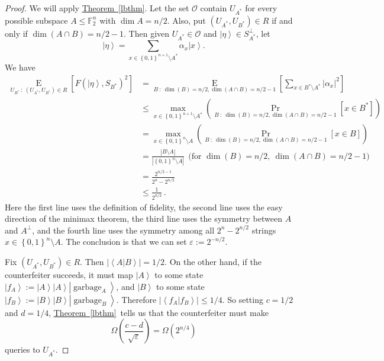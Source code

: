 \documentclass[10pt]{article}
\theoremstyle{definition}
\numberwithin{equation}{section}
\newcommand{\expref}[2]{\texorpdfstring{\hyperref[#2]{#1~\ref{#2}}}{#1~\ref{#2}}}
\begin{document}
\begin{proof}
We will apply \expref{Theorem}{lbthm}. Let the set $\mathcal{O}$ contain
$U_{A^{\ast}}$ for every possible subspace $A\leq\mathbb{F}_{2}^{n}$ with
$\dim A=n/2$. Also, put $\left(  U_{A^{\ast}},U_{B^{\ast}}\right)  \in
R$ if and only if $\dim\left(  A\cap B\right)  =n/2-1$. Then given
$U_{A^{\ast}}\in\mathcal{O}$ and $\left\vert \eta\right\rangle \in
S_{A^{\ast}}^{\bot}$, let%
\[
\left\vert \eta\right\rangle =\sum_{x\in\left\{  0,1\right\}  ^{n+1}\setminus
A^{\ast}}\alpha_{x}\left\vert x\right\rangle .
\]
We have%
\begin{align*}
\operatorname*{E}_{U_{B^{\ast}}~:~\left(  U_{A^{\ast}},U_{B^{\ast}}\right)
\in R}\left[  F\left(  \left\vert \eta\right\rangle ,S_{B^{\ast}}\right)
^{2}\right]   &  =\operatorname*{E}_{B~:~\dim\left(  B\right)  =n/2,\dim
\left(  A\cap B\right)  =n/2-1}\left[  \sum_{x\in B^{\ast}\setminus A^{\ast}%
}\left\vert \alpha_{x}\right\vert ^{2}\right] \\
&  \leq\max_{x\in\left\{  0,1\right\}  ^{n+1}\setminus A^{\ast}}\left(
\Pr_{B~:~\dim\left(  B\right)  =n/2,\dim\left(  A\cap B\right)  =n/2-1}\left[
x\in B^{\ast}\right]  \right) \\
&  =\max_{x\in\left\{  0,1\right\}  ^{n}\setminus A}\left(  \Pr_{B~:~\dim
\left(  B\right)  =n/2,\dim\left(  A\cap B\right)  =n/2-1}\left[  x\in
B\right]  \right) \\
&  =\frac{\left\vert B\setminus A\right\vert }{\left\vert \left\{
0,1\right\}  ^{n}\setminus A\right\vert }~~\text{(for }\dim\left(  B\right)
=n/2,~\dim\left(  A\cap B\right)  =n/2-1\text{)}\\
&  =\frac{2^{n/2-1}}{2^{n}-2^{n/2}}\\
&  \leq\frac{1}{2^{n/2}}\,.
\end{align*}
Here the first line uses the definition of fidelity, the second line uses the
easy direction of the minimax theorem, the third line uses the symmetry
between $A$ and $A^{\bot}$, and the fourth line uses the symmetry among all
$2^{n}-2^{n/2}$ strings\ $x\in\left\{  0,1\right\}  ^{n}\setminus A$. The
conclusion is that we can set $\varepsilon:=2^{-n/2}$.

Fix $\left(  U_{A^{\ast}},U_{B^{\ast}}\right)  \in R$. Then $\left\vert
\left\langle A|B\right\rangle \right\vert =1/2$. On the other hand, if the
counterfeiter succeeds, it must map $\left\vert A\right\rangle $ to some
state $\left\vert f_{A}\right\rangle :=\left\vert A\right\rangle \left\vert
A\right\rangle \left\vert \operatorname{garbage}_{A}\right\rangle $, and
$\left\vert B\right\rangle $ to some state $\left\vert f_{B}\right\rangle
:=\left\vert B\right\rangle \left\vert B\right\rangle \left\vert
\operatorname{garbage}_{B}\right\rangle $. Therefore $\left\vert
\left\langle f_{A}|f_{B}\right\rangle \right\vert \leq1/4$. So setting
$c=1/2$ and $d=1/4$, \expref{Theorem}{lbthm}\ tells us that the counterfeiter
must make%
\[
\Omega\left(  \frac{c-d}{\sqrt{\varepsilon}}\right)  =\Omega\left(
2^{n/4}\right)
\]
queries to $U_{A^{\ast}}$.
\end{proof}
\end{document}
